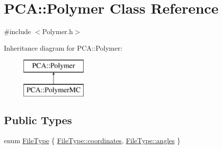 \hypertarget{class_p_c_a_1_1_polymer}{}\section{P\+CA\+:\+:Polymer Class Reference}
\label{class_p_c_a_1_1_polymer}


{\ttfamily \#include $<$Polymer.\+h$>$}

Inheritance diagram for P\+CA\+:\+:Polymer\+:\begin{figure}[H]
\begin{center}
\leavevmode
\includegraphics[height=2.000000cm]{class_p_c_a_1_1_polymer}
\end{center}
\end{figure}
\subsection*{Public Types}
\begin{DoxyCompactItemize}
\item 
enum \hyperlink{class_p_c_a_1_1_polymer_a1df36a764fbf04ccd5cbe8edb49d43bd}{File\+Type} \{ \hyperlink{class_p_c_a_1_1_polymer_a1df36a764fbf04ccd5cbe8edb49d43bda8387d77faaaa65484f5631d9f9d20bfc}{File\+Type\+::coordinates}, 
\hyperlink{class_p_c_a_1_1_polymer_a1df36a764fbf04ccd5cbe8edb49d43bda9bd139e0f52be4a748903ff60b5d3985}{File\+Type\+::angles}
 \}
\end{DoxyCompactItemize}
